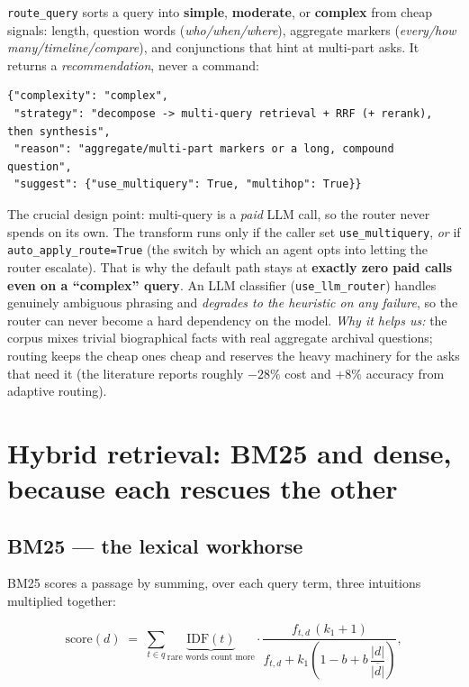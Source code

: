\documentclass[11pt]{article}
\newcommand{\code}[1]{\texttt{#1}}
\begin{document}
\code{route\_query} sorts a query into \textbf{simple}, \textbf{moderate}, or \textbf{complex} from
cheap signals: length, question words (\emph{who/when/where}), aggregate markers
(\emph{every/how many/timeline/compare}), and conjunctions that hint at multi-part asks. It returns a
\emph{recommendation}, never a command:

\begin{lstlisting}
{"complexity": "complex",
 "strategy": "decompose -> multi-query retrieval + RRF (+ rerank), then synthesis",
 "reason": "aggregate/multi-part markers or a long, compound question",
 "suggest": {"use_multiquery": True, "multihop": True}}
\end{lstlisting}

\noindent The crucial design point: multi-query is a \emph{paid} LLM call, so the router never spends
on its own. The transform runs only if the caller set \code{use\_multiquery}, \emph{or} if
\code{auto\_apply\_route=True} (the switch by which an agent opts into letting the router escalate).
That is why the default path stays at \textbf{exactly zero paid calls even on a ``complex'' query}.
An LLM classifier (\code{use\_llm\_router}) handles genuinely ambiguous phrasing and \emph{degrades
to the heuristic on any failure}, so the router can never become a hard dependency on the model.
\emph{Why it helps us:} the corpus mixes trivial biographical facts with real aggregate archival
questions; routing keeps the cheap ones cheap and reserves the heavy machinery for the asks that
need it (the literature reports roughly $-28\%$ cost and $+8\%$ accuracy from adaptive routing).

\section{Hybrid retrieval: BM25 and dense, because each rescues the other}

\subsection{BM25 --- the lexical workhorse}

BM25 scores a passage by summing, over each query term, three intuitions multiplied together:

\[
\text{score}(d) \;=\; \sum_{t \in q} \underbrace{\mathrm{IDF}(t)}_{\text{rare words count more}}
\cdot
\frac{f_{t,d}\,(k_1+1)}
     {f_{t,d} + k_1\!\left(1 - b + b\,\dfrac{|d|}{\overline{|d|}}\right)},
\]
\end{document}
